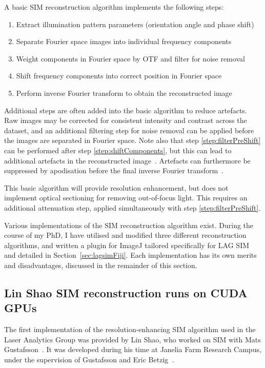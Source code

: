 A basic SIM reconstruction algorithm implements the following steps:
\begin{enumerate}
	\item Extract illumination pattern parameters (orientation angle and phase shift)
	\item Separate Fourier space images into individual frequency components
	\item \label{step:filterPreShift}Weight components in Fourier space by OTF and filter for noise removal
	\item \label{step:shiftComponents}Shift frequency components into correct position in Fourier space
	\item Perform inverse Fourier transform to obtain the reconstructed image
\end{enumerate}

Additional steps are often added into the basic algorithm to reduce artefacts.
Raw images may be corrected for consistent intensity and contrast across the dataset, and an additional filtering step for noise removal can be applied before the images are separated in Fourier space.
Note also that step \ref{step:filterPreShift} can be performed after step \ref{step:shiftComponents}, but this can lead to additional artefacts in the reconstructed image~\cite{gustafsson2008three}.
Artefacts can furthermore be suppressed by apodisation before the final inverse Fourier transform~\cite{gustafsson2008three}.

This basic algorithm will provide resolution enhancement, but does not implement optical sectioning for removing out-of-focus light.
This requires an additional attenuation step, applied simultaneously with step \ref{step:filterPreShift}.

Various implementations of the SIM reconstruction algorithm exist.
During the course of my PhD, I have utilised and modified three different reconstruction algorithms, and written a plugin for ImageJ tailored specifically for LAG SIM and detailed in Section~\ref{sec:lagsimFiji}.
Each implementation has its own merits and disadvantages, discussed in the remainder of this section.

\subsection{Lin Shao SIM reconstruction runs on CUDA GPUs}
The first implementation of the resolution-enhancing SIM algorithm used in the Laser Analytics Group was provided by Lin Shao, who worked on SIM with Mats Gustafsson~\cite{shao2011super}.
It was developed during his time at Janelia Farm Research Campus, under the supervision of Gustafsson and Eric Betzig~\cite{beach2014nonmuscle}.


